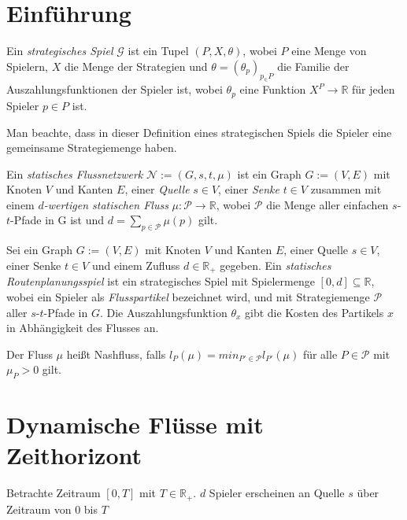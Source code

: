 \section{Einführung}\label{introduction}

\newcommand{\R}{\mathbb{R}}

\begin{definition}
	Ein \emph{strategisches Spiel} $\mathcal{G}$ ist ein Tupel $(P, X, \theta)$, wobei $P$ eine Menge von Spielern, $X$ die Menge der Strategien  und $\theta=(\theta_p)_{p_\in P}$ die Familie der Auszahlungsfunktionen der Spieler ist, wobei $\theta_p$ eine Funktion $X^P\to\R$ für jeden Spieler $p\in P$ ist.
\end{definition}

Man beachte, dass in dieser Definition eines strategischen Spiels die Spieler eine gemeinsame Strategiemenge haben.

\begin{definition}
	Ein \emph{statisches Flussnetzwerk} $\mathcal{N}:=(G,s,t,\mu)$ ist ein Graph $G:=(V,E)$ mit Knoten $V$ und Kanten $E$, einer \emph{Quelle} $s\in V$, einer \emph{Senke} $t\in V$ zusammen mit einem \emph{$d$-wertigen statischen Fluss} $\mu: \mathcal{P} \to \R$, wobei $\mathcal{P}$ die Menge aller einfachen $s$-$t$-Pfade in G ist und $d=\sum_{p\in\mathcal{P}}\mu(p)$ gilt.
\end{definition}

\begin{definition}
	Sei ein Graph $G:=(V,E)$ mit Knoten $V$ und Kanten $E$, einer Quelle $s\in V$, einer Senke $t\in V$ und einem Zufluss $d\in\R_+$ gegeben.
	Ein \emph{statisches Routenplanungsspiel} ist ein strategisches Spiel mit  Spielermenge $[0,d]\subseteq\R$, wobei ein Spieler als \emph{Flusspartikel} bezeichnet wird, und mit Strategiemenge $\mathcal{P}$ aller $s$-$t$-Pfade in $G$.
	Die Auszahlungsfunktion $\theta_x$ gibt die Kosten des Partikels $x$ in Abhängigkeit des Flusses an.
	
	Der Fluss $\mu$ heißt Nashfluss, falls $l_P(\mu)=min_{P'\in\mathcal{P}}l_{P'}(\mu)$ für alle $P\in\mathcal{P}$ mit $\mu_P > 0$ gilt.
\end{definition}

\section{Dynamische Flüsse mit Zeithorizont}


Betrachte Zeitraum $[0,T]$ mit $T\in\R_+$.
$d$ Spieler erscheinen an Quelle $s$ über Zeitraum von $0$ bis $T$

